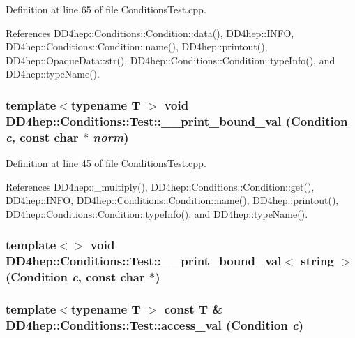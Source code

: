 Definition at line 65 of file ConditionsTest.cpp.

References DD4hep::Conditions::Condition::data(), DD4hep::INFO, DD4hep::Conditions::Condition::name(), DD4hep::printout(), DD4hep::OpaqueData::str(), DD4hep::Conditions::Condition::typeInfo(), and DD4hep::typeName().\hypertarget{namespace_d_d4hep_1_1_conditions_1_1_test_a2a07c4c54934f051caed3cf6d88e5074}{
\subsubsection[{\_\-\_\-print\_\-bound\_\-val}]{\setlength{\rightskip}{0pt plus 5cm}template$<$typename T $>$ void DD4hep::Conditions::Test::\_\-\_\-print\_\-bound\_\-val ({\bf Condition} {\em c}, \/  const char $\ast$ {\em norm})}}
\label{namespace_d_d4hep_1_1_conditions_1_1_test_a2a07c4c54934f051caed3cf6d88e5074}


Definition at line 45 of file ConditionsTest.cpp.

References DD4hep::\_\-multiply(), DD4hep::Conditions::Condition::get(), DD4hep::INFO, DD4hep::Conditions::Condition::name(), DD4hep::printout(), DD4hep::Conditions::Condition::typeInfo(), and DD4hep::typeName().\hypertarget{namespace_d_d4hep_1_1_conditions_1_1_test_aaf53c694ea981e815836c9d98ded23f4}{
\subsubsection[{\_\-\_\-print\_\-bound\_\-val$<$ string $>$}]{\setlength{\rightskip}{0pt plus 5cm}template$<$$>$ void DD4hep::Conditions::Test::\_\-\_\-print\_\-bound\_\-val$<$ {\bf string} $>$ ({\bf Condition} {\em c}, \/  const char $\ast$)}}
\label{namespace_d_d4hep_1_1_conditions_1_1_test_aaf53c694ea981e815836c9d98ded23f4}
\hypertarget{namespace_d_d4hep_1_1_conditions_1_1_test_a4ad4f8e918d11c5287e5703c68bde9db}{
\subsubsection[{access\_\-val}]{\setlength{\rightskip}{0pt plus 5cm}template$<$typename T $>$ const {\bf T} \& DD4hep::Conditions::Test::access\_\-val (Condition {\em c})}}
\label{namespace_d_d4hep_1_1_conditions_1_1_test_a4ad4f8e918d11c5287e5703c68bde9db}


